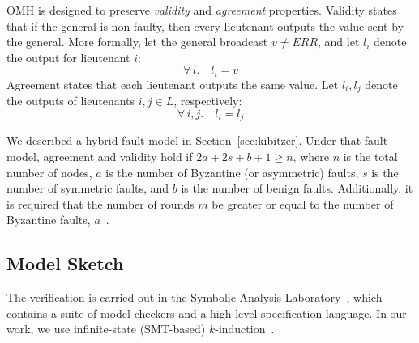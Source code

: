 \documentclass{llncs/llncs}
\newcommand{\OM}[1]{\ensuremath{\mathrm{OM}(#1)}}
\begin{document}

OMH is designed to preserve \emph{validity} and \emph{agreement}
properties. Validity states that if the general is non-faulty, then every lieutenant outputs the value sent by the general. More formally, let the general broadcast $v \neq ERR$, and let $l_i$ denote the output for lieutenant $i$:
%
\begin{equation}
  \tag{Validity}
    \forall \,i. \quad l_i = v
\end{equation}
%
Agreement states that each lieutenant outputs the same value. Let $l_i, l_j$ denote the outputs of lieutenants $i, j \in L$, respectively:
%
\begin{equation}
  \tag{Agreement}
    \forall \,i, j. \quad l_i = l_j
\end{equation}
%

We described a hybrid fault model in Section~\ref{sec:kibitzer}. Under that fault model, agreement and validity hold if $2a+2s+b+1 \geq n$, where $n$ is the total number of nodes, $a$ is the number of Byzantine (or asymmetric) faults, $s$ is the number of symmetric faults, and $b$ is the number of benign faults. Additionally, it is required that the number of rounds $m$ be greater or equal to the number of Byzantine faults, $a$~\cite{csl-93-2,hybrid}.

\subsection{Model Sketch}
The verification is carried out in the Symbolic Analysis Laboratory~\cite{}, which contains a suite of model-checkers and a high-level specification language. In our work, we use infinite-state (SMT-based) $k$-induction~\cite{}.
\end{document}
